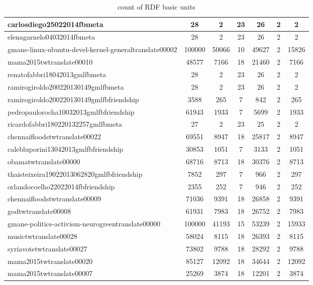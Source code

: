 \begin{table*}[h!]
\begin{center}
\begin{tabular}{| l | c | c | c | c | c | c |}
carlosdiego25022014fbmeta & 28  & 2  & 23  & 26  & 2  & 2 \\\hline
elenagarnelo04032014fbmeta & 28  & 2  & 23  & 26  & 2  & 2 \\\hline
gmane-linux-ubuntu-devel-kernel-generaltranslate00002 & 100000  & 50066  & 10  & 49627  & 2  & 15826 \\\hline
mama2015twtranslate00010 & 48577  & 7166  & 18  & 21460  & 2  & 7166 \\\hline
renatofabbri18042013gmlfbmeta & 28  & 2  & 23  & 26  & 2  & 2 \\\hline
ramirogiroldo200220130149gmlfbmeta & 28  & 2  & 23  & 26  & 2  & 2 \\\hline
ramirogiroldo200220130149gmlfbfriendship & 3588  & 265  & 7  & 842  & 2  & 265 \\\hline
pedropaulorocha10032013gmlfbfriendship & 61943  & 1933  & 7  & 5699  & 2  & 1933 \\\hline
ricardofabbri180220132257gmlfbmeta & 27  & 2  & 23  & 25  & 2  & 2 \\\hline
chennaifloodstwtranslate00022 & 69551  & 8947  & 18  & 25817  & 2  & 8947 \\\hline
calebluporini13042013gmlfbfriendship & 30853  & 1051  & 7  & 3133  & 2  & 1051 \\\hline
obamatwtranslate00000 & 68716  & 8713  & 18  & 30376  & 2  & 8713 \\\hline
thaisteixeira19022013062820gmlfbfriendship & 7852  & 297  & 7  & 966  & 2  & 297 \\\hline
orlandocoelho22022014fbfriendship & 2355  & 252  & 7  & 946  & 2  & 252 \\\hline
chennaifloodstwtranslate00009 & 71036  & 9391  & 18  & 26858  & 2  & 9391 \\\hline
godtwtranslate00008 & 61931  & 7983  & 18  & 26752  & 2  & 7983 \\\hline
gmane-politics-activism-neurogreentranslate00000 & 100000  & 41193  & 15  & 53239  & 2  & 15933 \\\hline
musictwtranslate00028 & 58024  & 8115  & 18  & 26393  & 2  & 8115 \\\hline
syriavotetwtranslate00027 & 73802  & 9788  & 18  & 28292  & 2  & 9788 \\\hline
mama2015twtranslate00020 & 85127  & 12092  & 18  & 34644  & 2  & 12092 \\\hline
mama2015twtranslate00007 & 25269  & 3874  & 18  & 12201  & 2  & 3874 \\\hline
\end{tabular}
\caption{count of RDF basic units}
\end{center}
\end{table*}